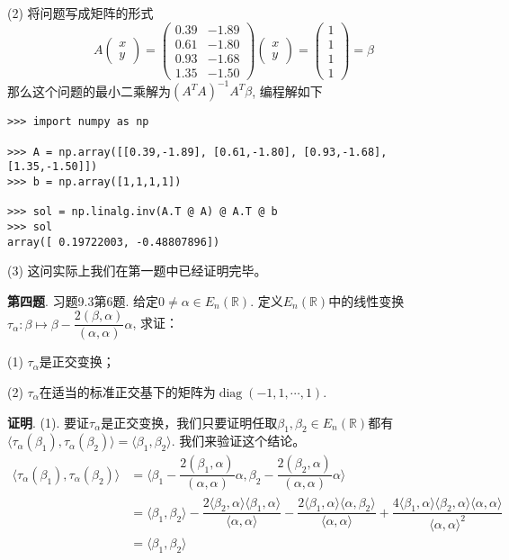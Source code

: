 (2) 将问题写成矩阵的形式
$$A\begin{pmatrix}
x \\ y
\end{pmatrix} = \begin{pmatrix}
0.39 & -1.89 \\ 0.61 & -1.80 \\ 0.93 & -1.68 \\ 1.35 & -1.50
\end{pmatrix}
\begin{pmatrix}
x \\ y
\end{pmatrix} = 
\begin{pmatrix}
1 \\ 1 \\ 1 \\ 1
\end{pmatrix} = \beta
$$
那么这个问题的最小二乘解为$(A^TA)^{-1}A^T\beta$, 编程解如下
\begin{lstlisting}
>>> import numpy as np

>>> A = np.array([[0.39,-1.89], [0.61,-1.80], [0.93,-1.68], [1.35,-1.50]])
>>> b = np.array([1,1,1,1])

>>> sol = np.linalg.inv(A.T @ A) @ A.T @ b
>>> sol
array([ 0.19722003, -0.48807896])
\end{lstlisting}

(3) 这问实际上我们在第一题中已经证明完毕。


\newpageorvspace


{\bf 第四题}. 习题9.3第6题. 给定$0 \neq \alpha \in E_n(\mathbb{R})$. 定义$E_n(\mathbb{R})$中的线性变换$\tau_{\alpha}: \beta \mapsto \beta - \dfrac{2(\beta, \alpha)}{(\alpha, \alpha)} \alpha$, 求证：

(1) $\tau_{\alpha}$是正交变换；

(2) $\tau_{\alpha}$在适当的标准正交基下的矩阵为$\operatorname{diag}(-1, 1, \cdots, 1)$.

\newpageorvspace

{\bf 证明}. (1). 要证$\tau_{\alpha}$是正交变换，我们只要证明任取$\beta_1, \beta_2 \in E_n(\mathbb{R})$都有$\langle \tau_{\alpha}(\beta_1), \tau_{\alpha}(\beta_2) \rangle = \langle \beta_1, \beta_2 \rangle$. 我们来验证这个结论。
\begin{align*}
\langle \tau_{\alpha}(\beta_1), \tau_{\alpha}(\beta_2) \rangle & = \langle \beta_1 - \dfrac{2(\beta_1, \alpha)}{(\alpha, \alpha)} \alpha, \beta_2 - \dfrac{2(\beta_2, \alpha)}{(\alpha, \alpha)} \alpha  \rangle \\
& = \langle \beta_1, \beta_2 \rangle - \dfrac{2\langle \beta_2, \alpha \rangle \langle \beta_1, \alpha \rangle}{\langle \alpha, \alpha \rangle}- \dfrac{2\langle \beta_1, \alpha \rangle \langle \alpha, \beta_2 \rangle}{\langle \alpha, \alpha \rangle} + \dfrac{4\langle \beta_1, \alpha \rangle \langle \beta_2, \alpha \rangle \langle \alpha, \alpha \rangle}{\langle \alpha, \alpha \rangle^2} \\
& = \langle \beta_1, \beta_2 \rangle
\end{align*}

